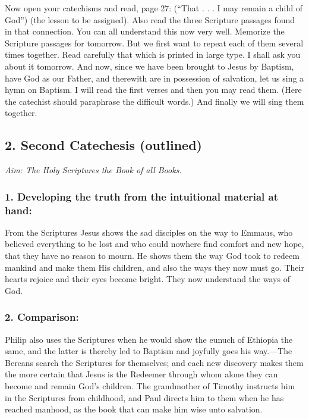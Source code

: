 Now open your catechisms and read, page 27: (“That . . . I may remain a child of God”) (the lesson to be assigned). Also read the three Scripture passages found in that connection. You can all understand this now very well. Memorize the Scripture passages for tomorrow. But we first want to repeat each of them several times together. Read carefully that which is printed in large type. I shall ask you about it tomorrow. And now, since we have been brought to Jesus by Baptism, have God as our Father, and therewith are in possession of salvation, let us sing a hymn on Baptism. I will read the first verses and then you may read them. (Here the catechist should paraphrase the difficult words.) And finally we will sing them together.

\subsection{2. Second Catechesis (outlined)}

\emph{Aim: The Holy Scriptures the Book of all Books.}

\subsubsection{1. Developing the truth from the intuitional material at hand:}

From the Scriptures Jesus shows the sad disciples on the way to Emmaus, who believed everything to be lost and who could nowhere find comfort and new hope, that they have no reason to mourn. He shows them the way God took to redeem mankind and make them His children, and also the ways they now must go. Their hearts rejoice and their eyes become bright. They now understand the ways of God.

\subsubsection{2. Comparison:} Philip also uses the Scriptures when he would show the eunuch of Ethiopia the same, and the latter is thereby led to Baptism and joyfully goes his way.—The Bereans search the Scriptures for themselves; and each new discovery makes them the more certain that Jesus is the Redeemer through whom alone they can become and remain God’s children. The grandmother of Timothy instructs him in the Scriptures from childhood, and Paul directs him to them when he has reached manhood, as the book that can make him wise unto salvation.

